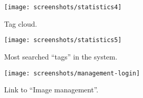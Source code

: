 \begin{figure}[h]
  \begin{center}
    \leavevmode
    \texttt{[image: screenshots/statistics4]}
    \caption{Tag cloud.}
    \label{fig:tagcloud}
  \end{center}
\end{figure}

\begin{figure}[h]
  \begin{center}
    \leavevmode
    \texttt{[image: screenshots/statistics5]}
    \caption{Most searched ``tags'' in the system.}
    \label{fig:mostsearched-tags}
  \end{center}
\end{figure}

\begin{figure}[h]
  \begin{center}
    \leavevmode
    \texttt{[image: screenshots/management-login]}
    \caption{Link to ``Image management''.}
    \label{fig:management-login}
  \end{center}
\end{figure}
